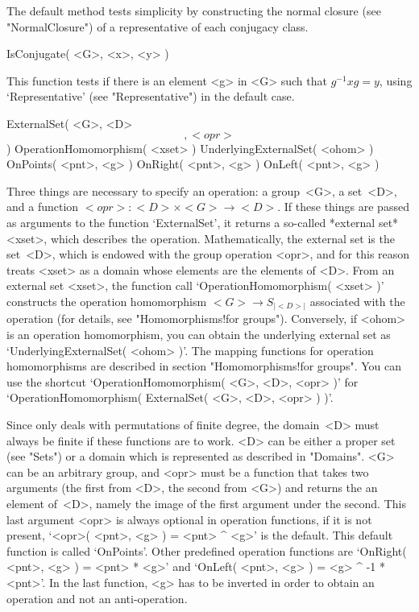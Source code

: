 The default method  tests simplicity by  constructing the  normal closure
(see "NormalClosure") of a representative of each conjugacy class.

\>IsConjugate( <G>, <x>, <y> )

This function tests   if  there is an  element    <g> in <G>   such  that
$g^{-1}xg=y$,  using  `Representative'  (see  "Representative")   in  the
default case.

\null

\>ExternalSet( <G>, <D> \[, <opr> \] )
%
\>OperationHomomorphism( <xset> )
%
\>UnderlyingExternalSet( <ohom> )
\>OnPoints( <pnt>, <g> )
\>OnRight( <pnt>, <g> )
\>OnLeft( <pnt>, <g> )

Three   things are  necessary  to  specify  an operation:  a group~<G>, a
set~<D>, and a  function  $<opr>\colon <D>\times  <G>\to <D>$.  If  these
things are passed as arguments to the  function `ExternalSet', it returns
a    so-called  *external set*  <xset>,  which   describes the operation.
Mathematically,  the external set  is the set~<D>,  which is endowed with
the group operation <opr>, and for this reason  {\GAP} treats <xset> as a
domain whose  elements are  the  elements  of <D>.  From an  external set
<xset>, the function  call  `OperationHomomorphism( <xset> )'  constructs
the   operation  homomorphism $<G>  \to  S_{|<D>|}$   associated with the
operation (for details, see  "Homomorphisms!for groups").  Conversely, if
<ohom>  is an   operation homomorphism,  you  can  obtain the  underlying
external set as `UnderlyingExternalSet( <ohom>  )'. The mapping functions
for operation homomorphisms  are described in  section "Homomorphisms!for
groups". You can use the shortcut `OperationHomomorphism( <G>, <D>, <opr>
)' for `OperationHomomorphism( ExternalSet( <G>, <D>, <opr> ) )'.

Since {\GAP}   only deals   with  permutations   of finite  degree,   the
domain~<D> must always be finite if these functions  are to work. <D> can
be either a  proper set (see "Sets") or  a domain which is represented as
described in "Domains". <G> can be an arbitrary  group, and <opr> must be
a {\GAP} function   that takes two arguments   (the first  from  <D>, the
second from <G>) and returns the  an element of~<D>,  namely the image of
the first argument under the  second. This last  argument <opr> is always
optional in operation functions, if it is not present, `<opr>( <pnt>, <g>
) =   <pnt>  ^ <g>' is  the  default.  This default function   is  called
`OnPoints'. Other predefined operation functions are `OnRight( <pnt>, <g>
) = <pnt> *  <g>' and `OnLeft( <pnt>, <g>  ) = <g>  ^ -1 * <pnt>'. In the
last function, <g> has to be inverted in order to obtain an operation and
not an anti-operation.

